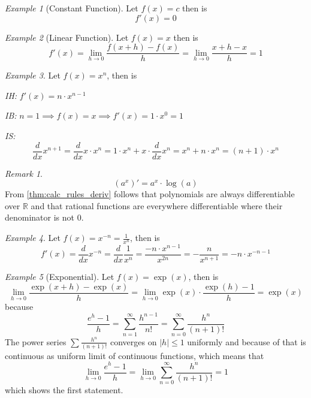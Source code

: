 \documentclass[english,titlepage]{uzhpub}
\theoremstyle{definition}
\theoremstyle{plain}
\theoremstyle{remark}
\newtheorem*{remark}{Remark}
\theoremstyle{example}
\newtheorem*{example}{Example}
\begin{document}
   \begin{example}[Constant Function]
      Let \(f(x) = c\) then is
      \[f'(x) = 0\]
   \end{example}
   \begin{example}[Linear Function]
      Let \(f(x) = x\) then is
      \[f'(x) = \lim_{h \to 0} \frac{f(x + h) - f(x)}{h} = \lim_{h \to 0} \frac{x + h - x}{h} = 1\]
   \end{example}
   \begin{example}
      Let \(f(x) = x^n\), then is

      \textit{IH:} \(f'(x) = n \cdot x^{n-1}\)

      \textit{IB:} \(n = 1 \implies f(x) = x \implies f'(x) = 1 \cdot x^0 = 1\)

      \textit{IS:}
      \[\frac{d}{dx} x^{n + 1} = \frac{d}{dx} x \cdot x^n = 1 \cdot x^n + x \cdot \frac{d}{dx} x^n = x^n + n \cdot x^n = (n + 1) \cdot x^n\]
   \end{example}
   \begin{remark}
      \[(a^x)' = a^x \cdot \log(a)\]
      From \cref{thm:calc_rules_deriv} follows that polynomials are always differentiable over \(\mathbb{R}\) and that rational functions are everywhere differentiable where their denominator is not 0.
   \end{remark}
   \begin{example}
      Let \(f(x) = x^{-n} = \frac{1}{x^n}\), then is
      \[f'(x) = \frac{d}{dx}x^{-n} = \frac{d}{dx} \frac{1}{x^n} = \frac{-n \cdot x^{n-1}}{x^{2n}} = -\frac{n}{x^{n+1}} = -n \cdot x^{-n - 1}\]
   \end{example}
   \begin{example}[Exponential]
      Let \(f(x) = \exp(x)\), then is
      \[\lim_{h \to 0} \frac{\exp(x + h) - \exp(x)}{h} = \lim_{h \to 0} \exp(x) \cdot \frac{\exp(h) - 1}{h} = \exp(x)\]
      because
      \[\frac{e^h - 1}{h} = \sum_{n=1}^\infty \frac{h^{n-1}}{n!} = \sum_{n = 0}^\infty \frac{h^n}{(n+1)!}\]
      The power series \(\sum \frac{h^n}{(n+1)!}\) converges on \(|h| \leq 1\) uniformly and because of that is continuous as uniform limit of continuous functions, which means that
      \[\lim_{h \to 0} \frac{e^h - 1}{h} = \lim_{h \to 0} \sum_{n=0}^\infty \frac{h^n}{(n+1)!} = 1\]
      which shows the first statement.
   \end{example}
\end{document}
